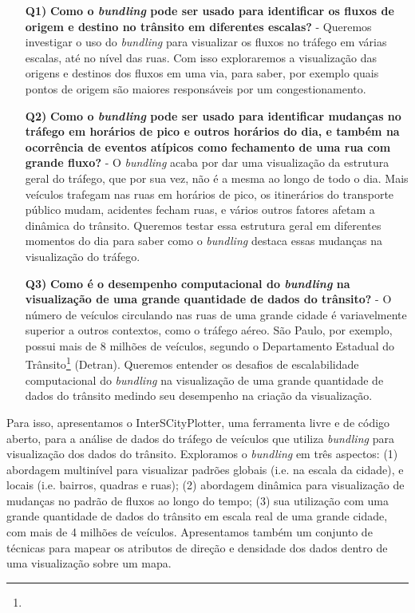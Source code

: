 \begin{itemize}
  \item[\textbf{Q1)}] \textbf{Como o \emph{bundling} pode ser usado para
identificar os fluxos de origem e destino no trânsito em diferentes escalas?} -
Queremos investigar o uso do \emph{bundling} para visualizar os fluxos no
tráfego em várias escalas, até no nível das ruas. Com isso exploraremos
a visualização das origens e destinos dos fluxos em uma via, para saber, por exemplo
quais pontos de origem são maiores responsáveis por um congestionamento.

  \item[\textbf{Q2)}] \textbf{Como o \emph{bundling} pode ser usado para
identificar mudanças no tráfego em horários de pico e outros horários do dia, e
também na ocorrência de eventos atípicos como fechamento de uma rua com grande
fluxo?} - O \emph{bundling} acaba por dar uma visualização da estrutura geral
do tráfego, que por sua vez, não é a mesma ao longo de todo o dia. Mais
veículos trafegam nas ruas em horários de pico, os itinerários do transporte
público mudam, acidentes fecham ruas, e vários outros fatores afetam a dinâmica
do trânsito. Queremos testar essa estrutura geral em diferentes momentos do dia
para saber como o \emph{bundling} destaca essas mudanças na visualização do
tráfego.

  \item[\textbf{Q3)}] \textbf{Como é o desempenho computacional do
\emph{bundling} na visualização de uma grande quantidade de dados do trânsito?}
- O número de veículos circulando nas ruas de uma grande cidade é variavelmente
superior a outros contextos, como o tráfego aéreo. São Paulo, por exemplo,
possui mais de 8 milhões de veículos, segundo o Departamento Estadual do
Trânsito\footnote{} (Detran). Queremos entender os
desafios de escalabilidade computacional do \emph{bundling} na visualização de
uma grande quantidade de dados do trânsito medindo seu desempenho na criação da
visualização.
\end{itemize}

 Para isso, apresentamos o InterSCityPlotter, uma ferramenta livre e de código
aberto, para a análise de dados do tráfego de veículos que utiliza
\emph{bundling} para visualização dos dados do trânsito.  Exploramos o
\emph{bundling} em três aspectos: (1) abordagem multinível para visualizar
padrões globais (i.e. na escala da cidade), e locais (i.e. bairros, quadras e
ruas); (2) abordagem dinâmica para visualização de mudanças no padrão de fluxos
ao longo do tempo; (3) sua utilização com uma grande quantidade de dados do
trânsito em escala real de uma grande cidade, com mais de 4 milhões de
veículos.  Apresentamos também um conjunto de técnicas para mapear os atributos
de direção e densidade dos dados dentro de uma visualização sobre um mapa.

